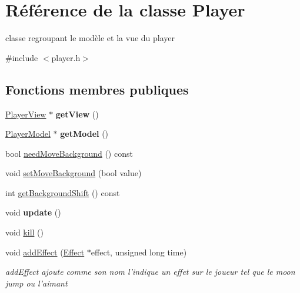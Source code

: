 \hypertarget{class_player}{\section{Référence de la classe Player}
\label{class_player}
}


classe regroupant le modèle et la vue du player  




{\ttfamily \#include $<$player.\+h$>$}

\subsection*{Fonctions membres publiques}
\begin{DoxyCompactItemize}
\item 
\hypertarget{class_player_a4826396832eaa65968294d9486f18af1}{\hyperlink{class_player_view}{Player\+View} $\ast$ {\bfseries get\+View} ()}\label{class_player_a4826396832eaa65968294d9486f18af1}

\item 
\hypertarget{class_player_a0e210f812702faa3508c01d53333cd4c}{\hyperlink{class_player_model}{Player\+Model} $\ast$ {\bfseries get\+Model} ()}\label{class_player_a0e210f812702faa3508c01d53333cd4c}

\item 
bool \hyperlink{class_player_a22844678397a6154c266a8d644047d28}{need\+Move\+Background} () const 
\item 
void \hyperlink{class_player_a7b9865029a4efa532ef83b823042778d}{set\+Move\+Background} (bool value)
\item 
int \hyperlink{class_player_a89324c2da84e6af40d8151ab518e1c7a}{get\+Background\+Shift} () const 
\item 
\hypertarget{class_player_a82c3476f3e65a4e2ac6bcd040771bdd4}{void {\bfseries update} ()}\label{class_player_a82c3476f3e65a4e2ac6bcd040771bdd4}

\item 
void \hyperlink{class_player_ab5d570eef42811790ef64f4acb88368a}{kill} ()
\item 
void \hyperlink{class_player_a0208b77668f82ff6317a70bf8aeb5461}{add\+Effect} (\hyperlink{class_effect}{Effect} $\ast$effect, unsigned long time)
\begin{DoxyCompactList}\small\item\em add\+Effect ajoute comme son nom l'indique un effet sur le joueur tel que le moon jump ou l'aimant \end{DoxyCompactList}\end{DoxyCompactItemize}


